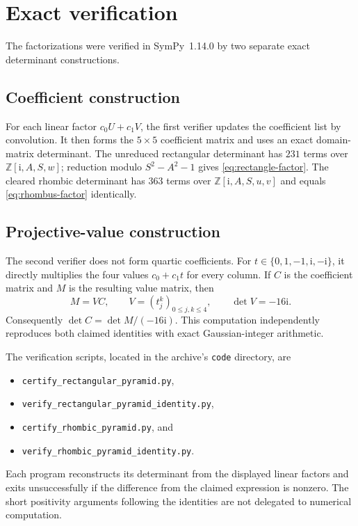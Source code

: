 \documentclass[11pt]{amsart}
\theoremstyle{definition}
\newcommand{\ii}{\mathrm{i}}
\begin{document}
\section{Exact verification}\label{sec:verification}

The factorizations were verified in SymPy~1.14.0 by two separate exact
determinant constructions.

\subsection{Coefficient construction}
For each linear factor $c_0U+c_1V$, the first verifier updates the coefficient
list by convolution. It then forms the $5\times5$ coefficient matrix and
uses an exact domain-matrix determinant. The unreduced rectangular
determinant has $231$ terms over $\mathbb Z[\ii,A,S,w]$; reduction modulo
$S^2-A^2-1$ gives \eqref{eq:rectangle-factor}. The cleared rhombic
determinant has $363$ terms over $\mathbb Z[\ii,A,S,u,v]$ and equals
\eqref{eq:rhombus-factor} identically.

\subsection{Projective-value construction}
The second verifier does not form quartic coefficients. For
$t\in\{0,1,-1,\ii,-\ii\}$, it directly multiplies the four values
$c_0+c_1t$ for every column. If $C$ is the coefficient matrix and $M$ is
the resulting value matrix, then
\[
M=VC,\qquad V=(t_j^k)_{0\leq j,k\leq4},\qquad \det V=-16\ii.
\]
Consequently $\det C=\det M/(-16\ii)$. This computation independently
reproduces both claimed identities with exact Gaussian-integer arithmetic.

The verification scripts, located in the archive's \texttt{code} directory,
are
\begin{itemize}
\item \texttt{certify\_rectangular\_pyramid.py},
\item \texttt{verify\_rectangular\_pyramid\_identity.py},
\item \texttt{certify\_rhombic\_pyramid.py}, and
\item \texttt{verify\_rhombic\_pyramid\_identity.py}.
\end{itemize}
Each program reconstructs its determinant from the displayed linear factors
and exits unsuccessfully if the difference from the claimed expression is
nonzero. The short positivity arguments following the identities are not
delegated to numerical computation.
\end{document}
